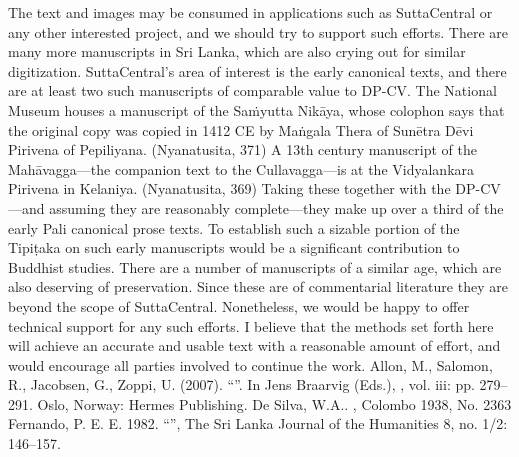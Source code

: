 {}The text and images may be consumed in applications such as SuttaCentral or any other interested project, and we should try to support such efforts.\markdownRendererInterblockSeparator
{}There are many more manuscripts in Sri Lanka, which are also crying out for similar digitization. SuttaCentral’s area of interest is the early canonical texts, and there are at least two such manuscripts of comparable value to DP-CV.\markdownRendererInterblockSeparator
{}\markdownRendererUlBegin
\markdownRendererUlItem The National Museum houses a manuscript of the Saṁyutta Nikāya, whose colophon says that the original copy was copied in 1412 CE by Maṅgala Thera of Sunētra Dēvi Pirivena of Pepiliyana. (Nyanatusita, 371)\markdownRendererUlItemEnd 
\markdownRendererUlItem A 13th century manuscript of the Mahāvagga—the companion text to the Cullavagga—is at the Vidyalankara Pirivena in Kelaniya. (Nyanatusita, 369)\markdownRendererUlItemEnd 
\markdownRendererUlEnd \markdownRendererInterblockSeparator
{}Taking these together with the DP-CV—and assuming they are reasonably complete—they make up over a third of the early Pali canonical prose texts. To establish such a sizable portion of the Tipiṭaka on such early manuscripts would be a significant contribution to Buddhist studies.\markdownRendererInterblockSeparator
{}There are a number of manuscripts of a similar age, which are also deserving of preservation. Since these are of commentarial literature they are beyond the scope of SuttaCentral. Nonetheless, we would be happy to offer technical support for any such efforts.\markdownRendererInterblockSeparator
{}I believe that the methods set forth here will achieve an accurate and usable text with a reasonable amount of effort, and would encourage all parties involved to continue the work.\markdownRendererInterblockSeparator
{}\markdownRendererInterblockSeparator
{}\markdownRendererUlBeginTight
\markdownRendererUlItem Allon, M., Salomon, R., Jacobsen, G., Zoppi, U. (2007). “”. In Jens Braarvig (Eds.), , vol. iii: pp. 279–291. Oslo, Norway: Hermes Publishing.\markdownRendererUlItemEnd 
\markdownRendererUlItem De Silva, W.A.. , Colombo 1938, No. 2363\markdownRendererUlItemEnd 
\markdownRendererUlItem Fernando, P. E. E. 1982. “”, The Sri Lanka Journal of the Humanities 8, no. 1/2: 146–157.\markdownRendererUlItemEnd 
